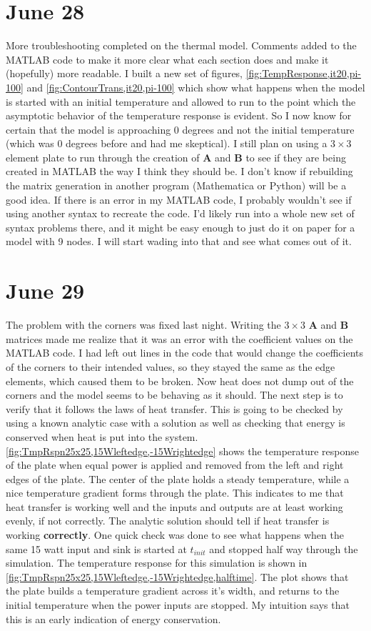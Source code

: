 \documentclass[10pt,twocolumn]{article}
\begin{document}
\section{June 28}
More troubleshooting completed on the thermal model. Comments added to the MATLAB code to make it more clear what each section does and make it (hopefully) more readable. I built a new set of figures, \autoref{fig:TempResponse,it20,pi-100} and \autoref{fig:ContourTrans,it20,pi-100} which show what happens when the model is started with an initial temperature and allowed to run to the point which the asymptotic behavior of the temperature response is evident. So I now know for certain that the model is approaching 0 degrees and not the initial temperature (which was 0 degrees before and had me skeptical). I still plan on using a $3\times3$ element plate to run through the creation of \textbf{A} and \textbf{B} to see if they are being created in MATLAB the way I think they should be. I don't know if rebuilding the matrix generation in another program (Mathematica or Python) will be a good idea. If there is an error in my MATLAB code, I probably wouldn't see if using another syntax to recreate the code. I'd likely run into a whole new set of syntax problems there, and it might be easy enough to just do it on paper for a model with 9 nodes. I will start wading into that and see what comes out of it.

\section{June 29}
The problem with the corners was fixed last night. Writing the $3\times3$ \textbf{A} and \textbf{B} matrices made me realize that it was an error with the coefficient values on the MATLAB code. I had left out lines in the code that would change the coefficients of the corners to their intended values, so they stayed the same as the edge elements, which caused them to be broken. Now heat does not dump out of the corners and the model seems to be behaving as it should. The next step is to verify that it follows the laws of heat transfer. This is going to be checked by using a known analytic case with a solution as well as checking that energy is conserved when heat is put into the system. \autoref{fig:TmpRspn25x25,15Wleftedge,-15Wrightedge} shows the temperature response of the plate when equal power is applied and removed from the left and right edges of the plate. The center of the plate holds a steady temperature, while a nice temperature gradient forms through the plate. This indicates to me that heat transfer is working well and the inputs and outputs are at least working evenly, if not correctly. The analytic solution should tell if heat transfer is working \textbf{correctly}. One quick check was done to see what happens when the same 15 watt input and sink is started at $t_{init}$ and stopped half way through the simulation. The temperature response for this simulation is shown in \autoref{fig:TmpRspn25x25,15Wleftedge,-15Wrightedge,halftime}. The plot shows that the plate builds a temperature gradient across it's width, and returns to the initial temperature when the power inputs are stopped. My intuition says that this is an early indication of energy conservation.
\end{document}
